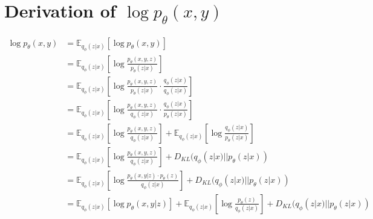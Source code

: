 \chapter{Derivation of $\log p_\theta(x,y)$}\label{appendix:full_derivation}

\begin{align}
    \log p_\theta(x, y) & = \mathbb{E}_{q_{\phi}(z | x)}\left[\log p_\theta(x, y)\right]        \label{eq:derivation_expactation}                                                                                                                          \\
                        & = \mathbb{E}_{q_{\phi}(z | x)}\left[\log \frac{p_\theta(x, y, z)}{p_\theta(z|x)} \right]    \label{eq:derivation_bayes}                                                                                                          \\
                        & = \mathbb{E}_{q_{\phi}(z | x)}\left[\log \frac{p_\theta(x, y, z)}{p_\theta(z|x)} \cdot \frac{q_\phi(z|x)}{q_\phi(z|x)}\right]    \label{eq:derivation_mul_1}                                                                     \\
                        & = \mathbb{E}_{q_{\phi}(z | x)}\left[\log \frac{p_\theta(x, y, z)}{q_\phi(z|x)} \cdot \frac{q_\phi(z|x)}{p_\theta(z|x)}\right]    \label{eq:derivation_reverse_denominator}                                                       \\
                        & = \mathbb{E}_{q_{\phi}(z | x)}\left[\log \frac{p_\theta(x, y, z)}{q_\phi(z|x)}\right] + \mathbb{E}_{q_{\phi}(z | x)}\left[\log \frac{q_\phi(z|x)}{p_\theta(z|x)}\right]  \label{eq:derivation_expand_log}                        \\
                        & = \mathbb{E}_{q_{\phi}(z | x)}\left[\log \frac{p_\theta(x, y, z)}{q_\phi(z|x)}\right] + D_{KL}(q_\phi(z|x) || p_\theta(z|x)) \label{eq:derivation_def_kl}                                                                        \\
                        & = \mathbb{E}_{q_{\phi}(z | x)}\left[ \log \frac{p_\theta(x, y | z) \cdot p_\theta(z)}{q_\phi(z|x)}\right] + D_{KL}(q_\phi(z|x) || p_\theta(z|x)) \label{eq:derivation_expansion_conditional}                                     \\
                        & = \mathbb{E}_{q_{\phi}(z | x)}\left[ \log p_\theta(x, y | z) \right] + \mathbb{E}_{q_{\phi}(z | x)}\left[ \log \frac{ p_\theta(z)}{q_\phi(z|x)}\right] + D_{KL}(q_\phi(z|x) || p_\theta(z|x)) \label{eq:derivation_expand_log_2} \\

\end{align}
